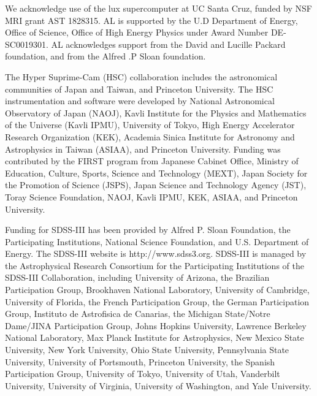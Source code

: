 \documentclass[fleqn,usenatbib,useAMS,english]{mnras}
\begin{document}
  We acknowledge use of the lux supercomputer at UC Santa Cruz, funded by NSF MRI grant AST
  1828315. AL is supported by the U.D Department of Energy, Office of Science, Office of High
  Energy Physics under Award Number DE-SC0019301. AL acknowledges support from the David and
  Lucille Packard foundation, and from the Alfred .P Sloan foundation.

  The Hyper Suprime-Cam (HSC) collaboration includes the astronomical communities of
  Japan and Taiwan, and Princeton University.  The HSC instrumentation and software were
  developed by National Astronomical Observatory of Japan (NAOJ), Kavli Institute
  for the Physics and Mathematics of the Universe (Kavli IPMU), University of Tokyo,
  High Energy Accelerator Research Organization (KEK), Academia Sinica Institute
  for Astronomy and Astrophysics in Taiwan (ASIAA), and Princeton University.
  Funding was contributed by the FIRST program from Japanese Cabinet Office,  Ministry
  of Education, Culture, Sports, Science and Technology (MEXT), Japan Society for
  the Promotion of Science (JSPS), Japan Science and Technology Agency (JST), Toray
  Science Foundation, NAOJ, Kavli IPMU, KEK, ASIAA, and Princeton University.

  Funding for SDSS-III has been provided by Alfred P. Sloan Foundation, the
  Participating Institutions, National Science Foundation, and U.S. Department of
  Energy. The SDSS-III website is http://www.sdss3.org.  SDSS-III is managed by the
  Astrophysical Research Consortium for the Participating Institutions of the SDSS-III
  Collaboration, including University of Arizona, the Brazilian Participation Group,
  Brookhaven National Laboratory, University of Cambridge, University of Florida, the
  French Participation Group, the German Participation Group, Instituto de Astrofisica
  de Canarias, the Michigan State/Notre Dame/JINA Participation Group, Johns Hopkins
  University, Lawrence Berkeley National Laboratory, Max Planck Institute for
  Astrophysics, New Mexico State University, New York University, Ohio State University,
  Pennsylvania State University, University of Portsmouth, Princeton University, the
  Spanish Participation Group, University of Tokyo, University of Utah, Vanderbilt
  University, University of Virginia, University of Washington, and Yale University.
\end{document}
